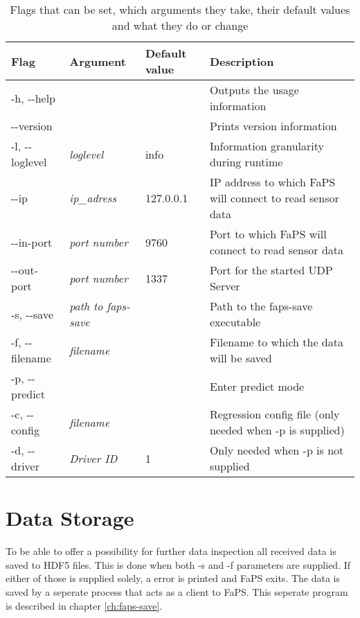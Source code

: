 \begin{table}[h]
    \centering
    \begin{tabular}{| l | l | l | p{5cm} |}
    \hline
    \textbf{Flag} & \textbf{Argument} & \textbf{Default value} & \textbf{Description} \\ \hline
    -h, -{}-help & & & Outputs the usage information \\ \hline
    -{}-version & & & Prints version information \\ \hline
    -l, -{}-loglevel & \textit{loglevel} & info & Information granularity during runtime \\ \hline
    -{}-ip & \textit{ip\_adress} & 127.0.0.1 & IP address to which FaPS will connect to read sensor data \\ \hline
    -{}-in-port & \textit{port number} & 9760 & Port to which FaPS will connect to read sensor data \\ \hline
    -{}-out-port & \textit{port number} & 1337 & Port for the started UDP Server \\ \hline
    -s, -{}-save & \textit{path to faps-save} & & Path to the faps-save executable \\ \hline
    -f, -{}-filename & \textit{filename} & & Filename to which the data will be saved \\ \hline
    -p, -{}-predict & & & Enter predict mode \\ \hline
    -c, -{}-config & \textit{filename} & & Regression config file (only needed when -p is supplied)  \\ \hline
    -d, -{}-driver & \textit{Driver ID} & 1 & Only needed when -p is not supplied \\ \hline
    \end{tabular}
    \caption{Flags that can be set, which arguments they take, their default values and what they do or change}
    \label{tab:faps_arguments}
\end{table}

\section{Data Storage}

To be able to offer a possibility for further data inspection all received data is saved to HDF5 files. This is done when both -s and -f parameters are supplied. If either of those is supplied solely, a error is printed and FaPS exits. The data is saved by a seperate process that acts as a client to FaPS. This seperate program is described in chapter \vref{ch:faps-save}.


